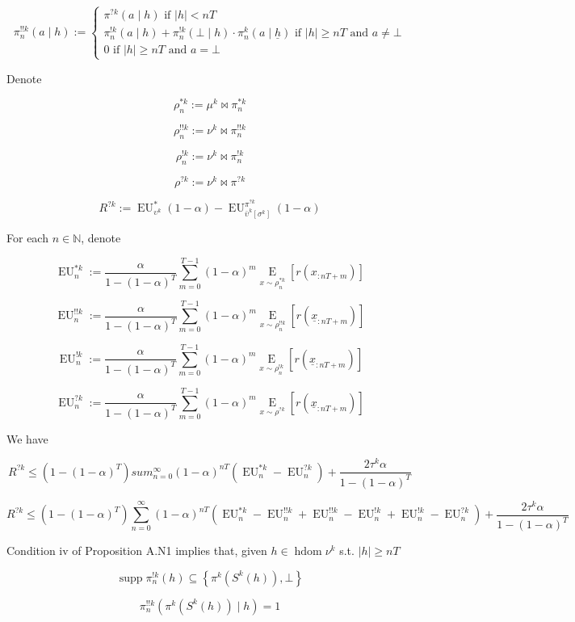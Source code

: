 \documentclass[a4paper]{article}
\DeclareMathOperator{\Supp}{supp}
\newcommand{\AP}[1]{\left(#1\right)}
\newcommand{\AB}[1]{\left[#1\right]}
\newcommand{\AC}[1]{\left\{#1\right\}}
\newcommand{\E}[1]{\underset{#1}{\operatorname{E}}}
\newcommand{\Nats}{\mathbb{N}}
\newcommand{\Abs}[1]{\left\vert #1 \right\vert}
\DeclareMathOperator{\HD}{hdom}
\newcommand{\EU}{\operatorname{EU}}
\begin{document}
$$\pi^{!!k}_n(a \mid h):=\begin{cases} \pi^{?k}(a \mid h) \text{ if } \Abs{h} < nT \\ \pi^{!k}_n(a \mid h) + \pi^{!k}_n(\bot \mid h) \cdot \pi^k_n\left(a \mid \underline{h}\right) \text{ if } \Abs{h} \geq nT \text{ and } a \ne \bot \\ 0 \text{ if } \Abs{h} \geq nT \text{ and } a = \bot \end{cases}$$

Denote 

$$\rho^{*k}_n:=\mu^k\bowtie\pi^{*k}_n$$

$$\rho^{!!k}_n:=\nu^k\bowtie\pi^{!!k}_n$$ 

$$\rho^{!k}_n:=\nu^k\bowtie\pi^{!k}_n$$ 

$$\rho^{?k}:=\nu^k\bowtie\pi^{?k}$$ 

$$R^{?k}:=\EU^{*}_{\upsilon^k}(1-\alpha)-\EU^{\pi^{?k}}_{\bar{\upsilon}^k\AB{\sigma^k}}(1-\alpha)$$

For each $n \in \Nats$, denote

$$\EU_n^{*k}:=\frac{\alpha}{1-(1-\alpha)^T}\sum_{m=0}^{T-1} (1-\alpha)^{m}\E{x\sim\rho^{*k}_n}\left[r\left(x_{:nT+m}\right)\right]$$

$$\EU_n^{!!k}:=\frac{\alpha}{1-(1-\alpha)^T}\sum_{m=0}^{T-1} (1-\alpha)^{m}\E{x\sim\rho^{!!k}_n}\left[r\left(\underline{x}_{:nT+m}\right)\right]$$

$$\EU_n^{!k}:=\frac{\alpha}{1-(1-\alpha)^T}\sum_{m=0}^{T-1} (1-\alpha)^{m}\E{x\sim\rho^{!k}_n}\left[r\left(\underline{x}_{:nT+m}\right)\right]$$

$$\EU_n^{?k}:=\frac{\alpha}{1-(1-\alpha)^T}\sum_{m=0}^{T-1} (1-\alpha)^{m}\E{x\sim\rho^{?k}}\left[r\left(\underline{x}_{:nT+m}\right)\right]$$

We have

$$R^{?k} \leq \AP{1-(1-\alpha)^T}sum_{n=0}^\infty (1-\alpha)^{nT} \left(\EU^{*k}_n-\EU^{?k}_n\right) + \frac{2\tau^k\alpha}{1-(1-\alpha)^T}$$

$$R^{?k} \leq\AP{1-(1-\alpha)^T}\sum_{n=0}^\infty (1-\alpha)^{nT} \left(\EU^{*k}_n-\EU^{!!k}_n+\EU^{!!k}_n-\EU^{!k}_n+\EU^{!k}_n-\EU^{?k}_n\right) + \frac{2\tau^k\alpha}{1-(1-\alpha)^T}$$

Condition iv of Proposition A.N1 implies that, given $h \in \HD{\nu^k}$ s.t. $\Abs{h} \geq nT$

$$\Supp{\pi^{!k}_n(h)} \subseteq \AC{\pi^k\AP{S^k(h)},\bot}$$

$$\pi^{!!k}_n\AP{\pi^k\AP{S^k(h)} \mid h} = 1$$
\end{document}
